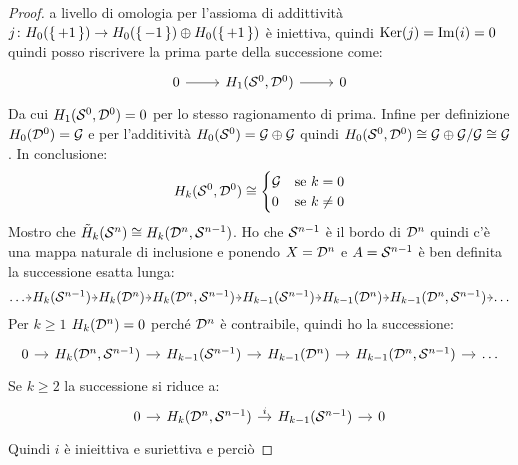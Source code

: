 \begin{proof}
  a livello di omologia per l'assioma di addittività $ j \colon H_0(\set{+1}) \to H_0(\set{-1}) \oplus H_0(\set{+1}) $
  è iniettiva, quindi $ \mathrm{Ker}( j) = \mathrm{Im}( i ) = 0 $ quindi posso riscrivere la prima
  parte della successione come:
  \[
    \begin{tikzcd}
      0 \rar & H_1(\Sph{0},\Disk{0}) \rar & 0
    \end{tikzcd}
  \]
  Da cui $ H_1(\mathcal{S}^{0},\mathcal{D}^{0}) = 0 $ per lo stesso ragionamento di prima.
  Infine per definizione $ H_0(\mathcal{D}^{0}) = \mathcal{G} $ e
  per l'additività $ H_0(\mathcal{S}^{0}) = \mathcal{G} \oplus \mathcal{G} $ quindi
  $ H_0(\mathcal{S}^{0}, \mathcal{D}^{0}) \cong {\mathcal{G} \oplus \mathcal{G}} \slash {\mathcal{G}} \cong \mathcal{G} $.
  In conclusione:
  \[
    H_k(\mathcal{S}^{0}, \mathcal{D}^{0}) \cong
    \begin{cases}
      \mathcal{G} & \text{se } k = 0 \\
      0 & \text{se } k \not =  0
    \end{cases}
  \]
  Mostro che $ \tilde{H}_k(\mathcal{S}^{n}) \cong H_k(\mathcal{D}^{n}, \mathcal{S}^{n-1}) $.
  Ho che $ \mathcal{S}^{n-1} $ è il bordo di $ \mathcal{D}^{n} $ quindi c'è una mappa naturale di inclusione
  e ponendo $ X = \mathcal{D}^{n} $ e $ A = \mathcal{S}^{n-1} $ è ben definita la successione esatta lunga:
  \[
    \begin{tikzcd}[nodes={column sep=4.5pt, inner sep=0.5pt}]
      \dots \rar & H_k(\Sph{n-1}) \rar & H_k(\Disk{n}) \rar & H_k(\Disk{n}, \Sph{n-1}) \rar
      & H_{k-1}(\Sph{n-1}) \rar & H_{k-1}(\Disk{n}) \rar & H_{k-1}(\Disk{n}, \Sph{n-1}) \rar & \dots
    \end{tikzcd}
  \]
  Per $ k \geq 1 $ $ H_k(\mathcal{D}^{n}) = 0 $ perché $ \mathcal{D}^{n} $ è contraibile, quindi ho la successione:
  \[
    \begin{tikzcd}[nodes={column sep=10pt}]
      0 \rar & H_k(\Disk{n}, \Sph{n-1}) \rar & H_{k-1}(\Sph{n-1}) \rar & H_{k-1}(\Disk{n}) \rar & H_{k-1}(\Disk{n}, \Sph{n-1}) \rar & \dots
    \end{tikzcd}
  \]
  Se $ k \geq 2 $ la successione si riduce a:
  \[
    \begin{tikzcd}[nodes={column sep=10pt}]
      0 \rar & H_k(\Disk{n}, \Sph{n-1}) \rar{i} & H_{k-1}(\Sph{n-1}) \rar & 0
    \end{tikzcd}
  \]
  Quindi $ i $ è inieittiva e suriettiva e perciò

\end{proof}
